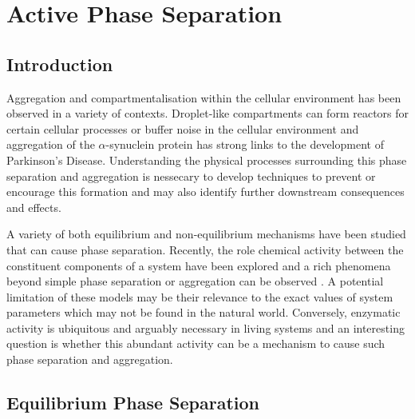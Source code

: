 

\chapter{\label{ch:2-draft}Active Phase Separation}

\minitoc

\section{Introduction}

Aggregation and compartmentalisation within the cellular environment has been observed in a variety of contexts\cite{weber_drops_2021}. Droplet-like compartments can form reactors for certain cellular processes\cite{nott_phase_2015} or buffer noise in the cellular environment\cite{klosin_phase_2020} and aggregation of the $\alpha$-synuclein protein has strong links to the development of Parkinson's Disease\cite{tong_loss_2010}. Understanding the physical processes surrounding this phase separation and aggregation is nessecary to develop techniques to prevent or encourage this formation and may also identify further downstream consequences and effects.

A variety of both equilibrium and non-equilibrium mechanisms have been studied that can cause phase separation\cite{li_non-equilibrium_2020,weber_drops_2021}. Recently, the role chemical activity between the constituent components of a system have been explored and a rich phenomena beyond simple phase separation or aggregation can be observed \cite{agudo-canalejo_active_2019}. A potential limitation of these models may be their relevance to the exact values of system parameters which may not be found in the natural world. Conversely, enzymatic activity is ubiquitous and arguably necessary in living systems and an interesting question is whether this abundant activity can be a mechanism to cause such phase separation and aggregation.

\section{Equilibrium Phase Separation}

